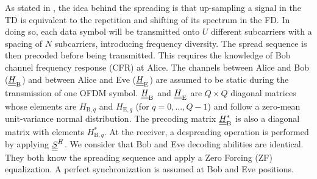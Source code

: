 \documentclass[conference]{IEEEtran}
\begin{document}
As stated in \cite{TR_FD_TD}, the idea behind the spreading is that up-sampling a signal in the TD is equivalent to the repetition and shifting of its spectrum in the FD. In doing so, each data symbol will be transmitted onto $U$ different subcarriers with a spacing of $N$ subcarriers, introducing frequency diversity. The spread sequence is then precoded before being transmitted. This requires the knowledge of Bob channel frequency response (CFR) at Alice.  The channels between Alice and Bob ($\underline{\underline{H}}_{\text{B}}$) and between Alice and Eve ($\underline{\underline{H}}_{\text{E}}$) are assumed to be static during the transmission of one OFDM symbol. $\underline{\underline{H}}_{\text{B}}$ and $\underline{\underline{H}}_{\text{E}}$ are $Q\times Q$ diagonal matrices whose elements are $H_{\text{B},q}$ and $H_{\text{E},q}$ (for $q = 0,...,Q-1$) and follow a zero-mean unit-variance normal distribution. The precoding matrix $\underline{\underline{H}}_{\text{B}}^*$ is also a diagonal matrix with elements $H_{\text{B},q}^*$. At the receiver, a despreading operation is performed by applying $\underline{\underline{S}}^H$. We consider that Bob and Eve decoding abilities are identical. They both know the spreading sequence and apply a Zero Forcing (ZF) equalization. A perfect synchronization is assumed at Bob and Eve positions.
\end{document}

